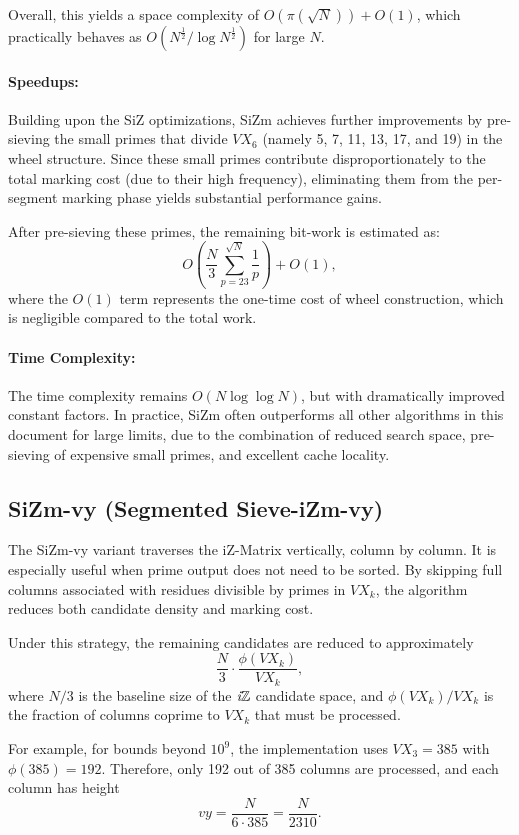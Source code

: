 \documentclass{article}
\begin{document}
Overall, this yields a space complexity of $O(\pi(\sqrt{N})) + O(1)$, which practically behaves as $O(N^{\tfrac{1}{2}}/\log N^{\tfrac{1}{2}})$ for large $N$.

\paragraph{Speedups:} 
Building upon the SiZ optimizations, SiZm achieves further improvements by pre-sieving the small primes that divide $VX_6$ (namely 5, 7, 11, 13, 17, and 19) in the wheel structure. Since these small primes contribute disproportionately to the total marking cost (due to their high frequency), eliminating them from the per-segment marking phase yields substantial performance gains.

After pre-sieving these primes, the remaining bit-work is estimated as:
\[
O\left(\frac{N}{3}\sum_{p=23}^{\sqrt N}\frac{1}{p}\right) + O(1),
\]
where the $O(1)$ term represents the one-time cost of wheel construction, which is negligible compared to the total work.

\paragraph{Time Complexity:} The time complexity remains $O(N \log \log N)$, but with dramatically improved constant factors. In practice, SiZm often outperforms all other algorithms in this document for large limits, due to the combination of reduced search space, pre-sieving of expensive small primes, and excellent cache locality.

\subsection{SiZm-vy (Segmented Sieve-iZm-vy)} \label{alg:sizm_vy}

The SiZm-vy variant traverses the iZ-Matrix vertically, column by column. It is especially useful when prime output does not need to be sorted. By skipping full columns associated with residues divisible by primes in $VX_k$, the algorithm reduces both candidate density and marking cost.

Under this strategy, the remaining candidates are reduced to approximately
$$\frac{N}{3}\cdot \frac{\phi(VX_k)}{VX_k},$$
where $N/3$ is the baseline size of the $\textit{i}\mathbb{Z}$ candidate space, and $\phi(VX_k)/VX_k$ is the fraction of columns coprime to $VX_k$ that must be processed.

For example, for bounds beyond $10^9$, the implementation uses $VX_3 = 385$ with $\phi(385) = 192$. Therefore, only 192 out of 385 columns are processed, and each column has height
\[
vy = \frac{N}{6 \cdot 385} = \frac{N}{2310}.
\]
\end{document}
